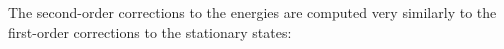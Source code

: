 \documentclass[10pt]{article}
\newcommand{\1}{\mathbf 1}
\begin{document}
The second-order corrections to the energies are computed very similarly to the first-order corrections to the stationary states:
\end{document}

